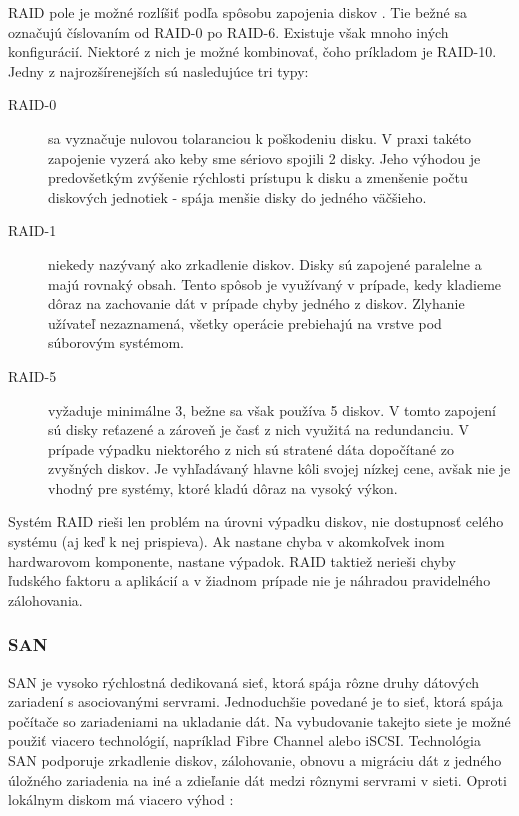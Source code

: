 RAID pole je možné rozlíšiť podľa spôsobu zapojenia diskov \cite{pdf:ha-blueprints}. Tie bežné sa označujú číslovaním od RAID-0 po RAID-6. Existuje však mnoho iných konfigurácií. Niektoré z nich je možné kombinovať, čoho príkladom je RAID-10. Jedny z najrozšírenejších sú nasledujúce tri typy:
\begin{description}
	\item[RAID-0] sa vyznačuje nulovou tolaranciou k poškodeniu disku. V praxi takéto zapojenie vyzerá ako keby sme sériovo spojili 2 disky. Jeho výhodou je predovšetkým zvýšenie rýchlosti prístupu k disku a zmenšenie počtu diskových jednotiek - spája menšie disky do jedného väčšieho.
	\item[RAID-1] niekedy nazývaný ako zrkadlenie diskov. Disky sú zapojené paralelne a majú rovnaký obsah. Tento spôsob je využívaný v prípade, kedy kladieme dôraz na zachovanie dát v prípade chyby jedného z diskov. Zlyhanie užívateľ nezaznamená, všetky operácie prebiehajú na vrstve pod súborovým systémom.
	\item[RAID-5] vyžaduje minimálne 3, bežne sa však používa 5 diskov. V tomto zapojení sú disky reťazené a zároveň je časť z nich využitá na redundanciu. V prípade výpadku niektorého z nich sú stratené dáta dopočítané zo zvyšných diskov. Je vyhľadávaný hlavne kôli svojej nízkej cene, avšak nie je vhodný pre systémy, ktoré kladú dôraz na vysoký výkon.
\end{description}

Systém RAID rieši len problém na úrovni výpadku diskov, nie dostupnosť celého systému (aj keď k nej prispieva). Ak nastane chyba v akomkoľvek inom hardwarovom komponente, nastane výpadok. RAID taktiež nerieši chyby ľudského faktoru a aplikácií a v žiadnom prípade nie je náhradou pravidelného zálohovania.

\subsubsection{SAN}
\ac{SAN} je vysoko rýchlostná dedikovaná sieť, ktorá spája rôzne druhy dátových zariadení s asociovanými servrami. Jednoduchšie povedané je to sieť, ktorá spája počítače so zariadeniami na ukladanie dát. Na vybudovanie takejto siete je možné použiť viacero technológií, napríklad Fibre Channel alebo iSCSI. Technológia SAN podporuje zrkadlenie diskov, zálohovanie, obnovu a migráciu dát z jedného úložného zariadenia na iné a zdieľanie dát medzi rôznymi servrami v sieti. Oproti lokálnym diskom má viacero výhod \cite{web:storage-area-network-1-uvod}:

